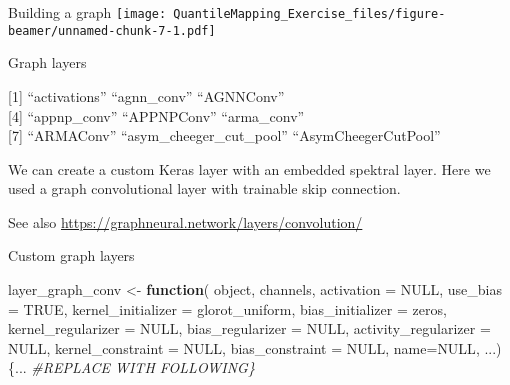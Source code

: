 \documentclass[
  ignorenonframetext,
]{beamer}
\newenvironment{Shaded}{\begin{snugshade}}{\end{snugshade}}
\newcommand{\AttributeTok}[1]{\textcolor[rgb]{0.77,0.63,0.00}{#1}}
\newcommand{\CommentTok}[1]{\textcolor[rgb]{0.56,0.35,0.01}{\textit{#1}}}
\newcommand{\ConstantTok}[1]{\textcolor[rgb]{0.00,0.00,0.00}{#1}}
\newcommand{\ControlFlowTok}[1]{\textcolor[rgb]{0.13,0.29,0.53}{\textbf{#1}}}
\newcommand{\DecValTok}[1]{\textcolor[rgb]{0.00,0.00,0.81}{#1}}
\newcommand{\FunctionTok}[1]{\textcolor[rgb]{0.00,0.00,0.00}{#1}}
\newcommand{\NormalTok}[1]{#1}
\newcommand{\OtherTok}[1]{\textcolor[rgb]{0.56,0.35,0.01}{#1}}
\newcommand{\SpecialCharTok}[1]{\textcolor[rgb]{0.00,0.00,0.00}{#1}}
\newcommand{\StringTok}[1]{\textcolor[rgb]{0.31,0.60,0.02}{#1}}
\begin{document}
\begin{frame}{Building a graph}
\protect\hypertarget{building-a-graph-1}{}
\texttt{[image: QuantileMapping\_Exercise\_files/figure-beamer/unnamed-chunk-7-1.pdf]}
\end{frame}

\begin{frame}[fragile]{Graph layers}
\protect\hypertarget{graph-layers}{}
\begin{Shaded}
\end{Shaded}

{[}1{]} ``activations'' ``agnn\_conv'' ``AGNNConv''\\
{[}4{]} ``appnp\_conv'' ``APPNPConv'' ``arma\_conv''\\
{[}7{]} ``ARMAConv'' ``asym\_cheeger\_cut\_pool'' ``AsymCheegerCutPool''

We can create a custom Keras layer with an embedded spektral layer. Here
we used a graph convolutional layer with trainable skip connection.

See also \url{https://graphneural.network/layers/convolution/}
\end{frame}

\begin{frame}[fragile]{Custom graph layers}
\protect\hypertarget{custom-graph-layers}{}
\begin{Shaded}
\begin{Highlighting}[]
\NormalTok{layer\_graph\_conv }\OtherTok{\textless{}{-}} \ControlFlowTok{function}\NormalTok{(}
\NormalTok{     object,}
\NormalTok{     channels,}
     \AttributeTok{activation =} \ConstantTok{NULL}\NormalTok{,}
     \AttributeTok{use\_bias =} \ConstantTok{TRUE}\NormalTok{,}
     \AttributeTok{kernel\_initializer =} \StringTok{\textquotesingle{}glorot\_uniform\textquotesingle{}}\NormalTok{,}
     \AttributeTok{bias\_initializer =} \StringTok{\textquotesingle{}zeros\textquotesingle{}}\NormalTok{,}
     \AttributeTok{kernel\_regularizer =} \ConstantTok{NULL}\NormalTok{,}
     \AttributeTok{bias\_regularizer =} \ConstantTok{NULL}\NormalTok{,}
     \AttributeTok{activity\_regularizer =} \ConstantTok{NULL}\NormalTok{,}
     \AttributeTok{kernel\_constraint =} \ConstantTok{NULL}\NormalTok{,}
     \AttributeTok{bias\_constraint =} \ConstantTok{NULL}\NormalTok{,}
     \AttributeTok{name=}\ConstantTok{NULL}\NormalTok{,}
\NormalTok{     ...)}
\NormalTok{\{... }\CommentTok{\#REPLACE WITH FOLLOWING\}}
\end{Highlighting}
\end{Shaded}
\end{frame}
\end{document}
